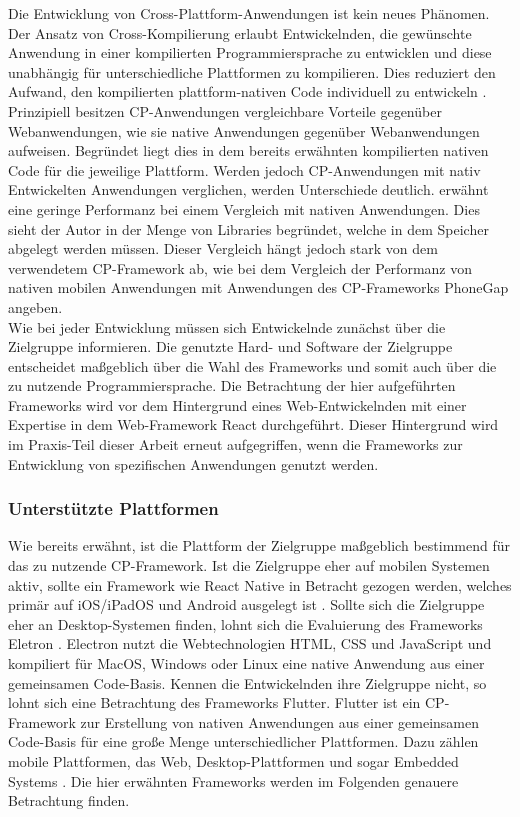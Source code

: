 \documentclass[a4paper]{scrartcl}
\begin{document}
Die Entwicklung von Cross-Plattform-Anwendungen ist kein neues Phänomen. Der Ansatz von Cross-Kompilierung erlaubt Entwickelnden, die gewünschte Anwendung in einer kompilierten Programmiersprache zu entwicklen und diese unabhängig für unterschiedliche Plattformen zu kompilieren. Dies reduziert den Aufwand, den kompilierten plattform-nativen Code individuell zu entwickeln \autocite[7]{Xamarin}. \\
Prinzipiell besitzen CP-Anwendungen vergleichbare Vorteile gegenüber Webanwendungen, wie sie native Anwendungen gegenüber Webanwendungen aufweisen. Begründet liegt dies in dem bereits erwähnten kompilierten nativen Code für die jeweilige Plattform. Werden jedoch CP-Anwendungen mit nativ Entwickelten Anwendungen verglichen, werden Unterschiede deutlich. \textcite[7]{Xamarin} erwähnt eine geringe Performanz bei einem Vergleich mit nativen Anwendungen. Dies sieht der Autor in der Menge von Libraries begründet, welche in dem Speicher abgelegt werden müssen. Dieser Vergleich hängt jedoch stark von dem verwendetem CP-Framework ab, wie \textcite[134]{CP-mobile} bei dem Vergleich der Performanz von nativen mobilen Anwendungen mit Anwendungen des CP-Frameworks PhoneGap angeben. \\
Wie bei jeder Entwicklung müssen sich Entwickelnde zunächst über die Zielgruppe informieren. Die genutzte Hard- und Software der Zielgruppe entscheidet maßgeblich über die Wahl des Frameworks und somit auch über die zu nutzende Programmiersprache. Die Betrachtung der hier aufgeführten Frameworks wird vor dem Hintergrund eines Web-Entwickelnden mit einer Expertise in dem Web-Framework React durchgeführt. Dieser Hintergrund wird im Praxis-Teil dieser Arbeit erneut aufgegriffen, wenn die Frameworks zur Entwicklung von spezifischen Anwendungen genutzt werden.

\subsubsection{Unterstützte Plattformen}

Wie bereits erwähnt, ist die Plattform der Zielgruppe maßgeblich bestimmend für das zu nutzende CP-Framework. Ist die Zielgruppe eher auf mobilen Systemen aktiv, sollte ein Framework wie React Native in Betracht gezogen werden, welches primär auf iOS/iPadOS und Android ausgelegt ist \autocite{React_Native}. Sollte sich die Zielgruppe eher an Desktop-Systemen finden, lohnt sich die Evaluierung des Frameworks Eletron \autocite{Electron.js}. Electron nutzt die Webtechnologien HTML, CSS und JavaScript und kompiliert für MacOS, Windows oder Linux eine native Anwendung aus einer gemeinsamen Code-Basis. Kennen die Entwickelnden ihre Zielgruppe nicht, so lohnt sich eine Betrachtung des Frameworks Flutter. Flutter ist ein CP-Framework zur Erstellung von nativen Anwendungen aus einer gemeinsamen Code-Basis für eine große Menge unterschiedlicher Plattformen. Dazu zählen mobile Plattformen, das Web, Desktop-Plattformen und sogar Embedded Systems \autocite{Flutter}. Die hier erwähnten Frameworks werden im Folgenden genauere Betrachtung finden.
\end{document}
